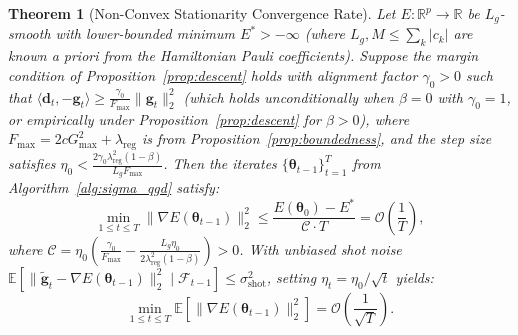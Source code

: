 \documentclass[11pt,a4paper]{article}
\newtheorem{theorem}{Theorem}
\begin{document}
\begin{theorem}[Non-Convex Stationarity Convergence Rate]
\label{thm:convergence}
Let $E: \mathbb{R}^p \to \mathbb{R}$ be $L_g$-smooth with lower-bounded minimum $E^* > -\infty$ (where $L_g, M \le \sum_k |c_k|$ are known a priori from the Hamiltonian Pauli coefficients). Suppose the margin condition of Proposition~\ref{prop:descent} holds with alignment factor $\gamma_0 > 0$ such that $\langle \mathbf{d}_t, -\mathbf{g}_t \rangle \ge \frac{\gamma_0}{F_{\max}} \|\mathbf{g}_t\|_2^2$ (which holds unconditionally when $\beta = 0$ with $\gamma_0 = 1$, or empirically under Proposition~\ref{prop:descent} for $\beta > 0$), where $F_{\max} = 2c G_{\max}^2 + \lambda_{\text{reg}}$ is from Proposition~\ref{prop:boundedness}, and the step size satisfies $\eta_0 < \frac{2\gamma_0 \lambda_{\text{reg}}^2 (1-\beta)}{L_g F_{\max}}$. Then the iterates $\{\boldsymbol{\theta}_{t-1}\}_{t=1}^T$ from Algorithm~\ref{alg:sigma_qgd} satisfy:
\begin{equation}
\min_{1 \le t \le T} \|\nabla E(\boldsymbol{\theta}_{t-1})\|_2^2 \le \frac{E(\boldsymbol{\theta}_0) - E^*}{\mathcal{C} \cdot T} = \mathcal{O}\left(\frac{1}{T}\right),
\label{eq:ergodic_rate}
\end{equation}
where $\mathcal{C} = \eta_0 \left( \frac{\gamma_0}{F_{\max}} - \frac{L_g \eta_0}{2 \lambda_{\text{reg}}^2 (1-\beta)} \right) > 0$. With unbiased shot noise $\mathbb{E}[\|\tilde{\mathbf{g}}_t - \nabla E(\boldsymbol{\theta}_{t-1})\|_2^2 \mid \mathcal{F}_{t-1}] \le \sigma_{\text{shot}}^2$, setting $\eta_t = \eta_0 / \sqrt{t}$ yields:
\begin{equation}
\min_{1 \le t \le T} \mathbb{E}\left[\|\nabla E(\boldsymbol{\theta}_{t-1})\|_2^2\right] = \mathcal{O}\left(\frac{1}{\sqrt{T}}\right).
\label{eq:stochastic_rate}
\end{equation}
\end{theorem}
\end{document}
